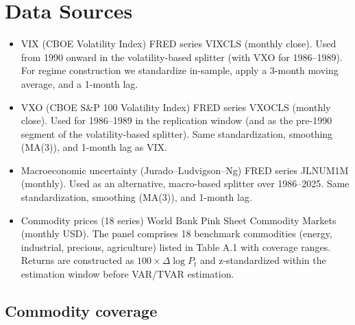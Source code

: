 \documentclass[
  11pt,
]{article}
\begin{document}
\section{Data Sources}\label{app-data}

\begin{itemize}
\item
  VIX (CBOE Volatility Index) FRED series VIXCLS (monthly close). Used from 1990 onward in the volatility-based splitter (with VXO for 1986--1989). For regime construction we standardize in-sample, apply a 3-month moving average, and a 1-month lag.
\item
  VXO (CBOE S\&P 100 Volatility Index) FRED series VXOCLS (monthly close). Used for 1986--1989 in the replication window (and as the pre-1990 segment of the volatility-based splitter). Same standardization, smoothing (MA(3)), and 1-month lag as VIX.
\item
  Macroeconomic uncertainty (Jurado--Ludvigson--Ng) FRED series JLNUM1M (monthly). Used as an alternative, macro-based splitter over 1986--2025. Same standardization, smoothing (MA(3)), and 1-month lag.
\item
  Commodity prices (18 series) World Bank Pink Sheet Commodity Markets (monthly USD). The panel comprises 18 benchmark commodities (energy, industrial, precious, agriculture) listed in Table A.1 with coverage ranges. Returns are constructed as \(100 \times \Delta \log P_t\) and z-standardized within the estimation window before VAR/TVAR estimation.
\end{itemize}

\subsection{Commodity coverage}\label{commodity-coverage}
\end{document}
